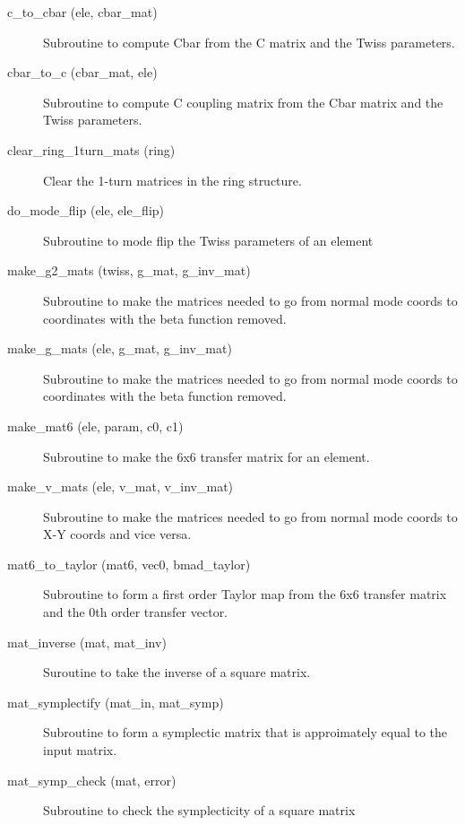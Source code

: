 \begin{description}

\item[c\_to\_cbar (ele, cbar\_mat)] \Newline
Subroutine to compute Cbar from the C matrix and the Twiss parameters. 

\item[cbar\_to\_c (cbar\_mat, ele)] \Newline
Subroutine to compute C coupling matrix from the Cbar matrix and the Twiss parameters. 

\item[clear\_ring\_1turn\_mats (ring)] \Newline
Clear the 1-turn matrices in the ring structure. 

\item[do\_mode\_flip (ele, ele\_flip)] \Newline
Subroutine to mode flip the Twiss parameters of an element 

\item[make\_g2\_mats (twiss, g\_mat, g\_inv\_mat)] \Newline
Subroutine to make the matrices needed to go from normal mode coords to 
coordinates with the beta function removed. 

\item[make\_g\_mats (ele, g\_mat, g\_inv\_mat)] \Newline
Subroutine to make the matrices needed to go from normal mode coords to 
coordinates with the beta function removed. 

\item[make\_mat6 (ele, param, c0, c1)] \Newline
Subroutine to make the 6x6 transfer matrix for an element. 

\item[make\_v\_mats (ele, v\_mat, v\_inv\_mat)] \Newline
Subroutine to make the matrices needed to go from normal mode coords to X-Y 
coords and vice versa. 

\item[mat6\_to\_taylor (mat6, vec0, bmad\_taylor)] \Newline
Subroutine to form a first order Taylor map from the 6x6 transfer matrix 
and the 0th order transfer vector. 

\item[mat\_inverse (mat, mat\_inv)] \Newline
Suroutine to take the inverse of a square matrix. 

\item[mat\_symplectify (mat\_in, mat\_symp)] \Newline
Subroutine to form a symplectic matrix that is approimately equal to the input matrix. 

\item[mat\_symp\_check (mat, error)] \Newline
Subroutine to check the symplecticity of a square matrix 


\end{description}
